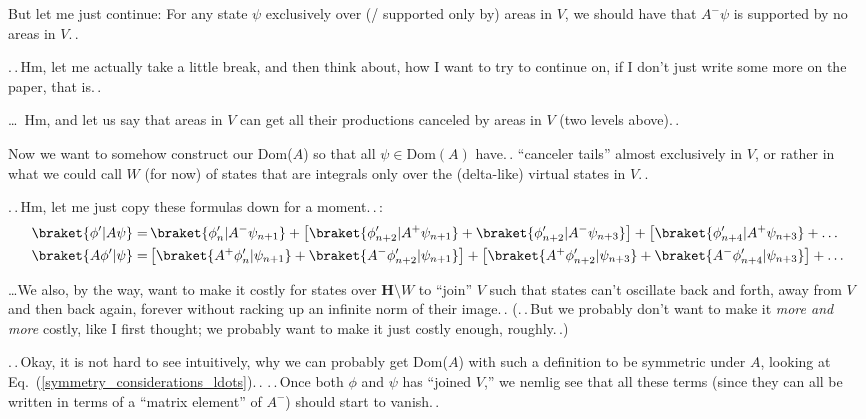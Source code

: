 \documentclass{report}
\begin{document}
But let me just continue: For any state $\psi$ exclusively over (/ supported only by) areas in $V$, we should have that $A^- \psi$ is supported by no areas in $V$.\,. 

.\,.\,Hm, let me actually take a little break, and then think about, how I want to try to continue on, if I don't just write some more on the paper, that is.\,. %

\ldots\ Hm, and let us say that areas in $V$ can get all their productions canceled by areas in $V$ (two levels above).\,. 

Now we want to somehow construct our Dom($A$) so that all $\psi\in\mathrm{Dom}(A)$ have.\,. ``canceler tails'' almost exclusively in $V$, or rather in what we could call $W$ (for now) of states that are integrals only over the (delta-like) virtual states in $V$.\,. 

.\,.\,Hm, let me just copy these formulas down for a moment.\,.\,:
\begin{align}
\begin{aligned}
	\braket{\phi'| A \psi} =&\, 
		\braket{\phi'_{n}   | A^- \psi_{n+1}} + \big[
		\braket{\phi'_{n+2} | A^+ \psi_{n+1}} + 
		\braket{\phi'_{n+2} | A^- \psi_{n+3}} \big] + \big[
		\braket{\phi'_{n+4} | A^+ \psi_{n+3}} + 
		\ldots\\
	\braket{A \phi'| \psi} =&\, 
		\big[
		\braket{A^+ \phi'_{n}   | \psi_{n+1}} + 
		\braket{A^- \phi'_{n+2} | \psi_{n+1}} \big] + \big[ 
		\braket{A^+ \phi'_{n+2} | \psi_{n+3}} + 
		\braket{A^- \phi'_{n+4} | \psi_{n+3}} \big] + 
		\ldots
	\label{symmetry_considerations_ldots}
\end{aligned}
\end{align}

\ldots We also, by the way, want to make it costly for states over $\mathbf{H} \setminus W$ to ``join'' $V$ such that states can't oscillate back and forth, away from $V$ and then back again, forever without racking up an infinite norm of their image.\,. (.\,.\,But we probably don't want to make it \emph{more and more} costly, like I first thought; we probably want to make it just costly enough, roughly.\,.) 

.\,.\,Okay, it is not hard to see intuitively, why we can probably get Dom($A$) with such a definition to be symmetric under $A$, looking at Eq.\ (\ref{symmetry_considerations_ldots}).\,. .\,.\,Once both $\phi$ and $\psi$ has ``joined $V$,'' we nemlig %
see that all these terms (since they can all be written in terms of a ``matrix element'' of $A^-$) should start to vanish.\,. 
\end{document}
